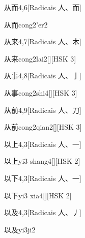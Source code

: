 \begin{entry}{从而}{4,6}[Radicais ⼈、⽽]
  \begin{phonetics}{从而}{cong2'er2}
  \end{phonetics}
\end{entry}

\begin{entry}{从来}{4,7}[Radicais ⼈、⽊]
  \begin{phonetics}{从来}{cong2lai2}[][HSK 3]
  \end{phonetics}
\end{entry}

\begin{entry}{从事}{4,8}[Radicais ⼈、⼅]
  \begin{phonetics}{从事}{cong2shi4}[][HSK 3]
  \end{phonetics}
\end{entry}

\begin{entry}{从前}{4,9}[Radicais ⼈、⼑]
  \begin{phonetics}{从前}{cong2qian2}[][HSK 3]
  \end{phonetics}
\end{entry}

\begin{entry}{以上}{4,3}[Radicais ⼈、⼀]
  \begin{phonetics}{以上}{yi3 shang4}[][HSK 2]
  \end{phonetics}
\end{entry}

\begin{entry}{以下}{4,3}[Radicais ⼈、⼀]
  \begin{phonetics}{以下}{yi3 xia4}[][HSK 2]
  \end{phonetics}
\end{entry}

\begin{entry}{以及}{4,3}[Radicais ⼈、⼃]
  \begin{phonetics}{以及}{yi3ji2}
  \end{phonetics}
\end{entry}

